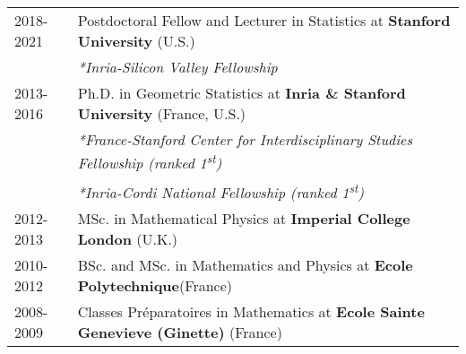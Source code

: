 \begin{tabularx}{\linewidth}{@{}l X@{}}	
2018-2021  & Postdoctoral Fellow and Lecturer in Statistics at \textbf{Stanford University} \hfill (U.S.)\\
& \textit{*Inria-Silicon Valley Fellowship}\\

2013-2016  & Ph.D. in Geometric Statistics at \textbf{Inria \& Stanford University} \hfill (France, U.S.)\\
& \textit{*France-Stanford Center for Interdisciplinary Studies Fellowship (ranked 1\textsuperscript{st})}\\
& \textit{*Inria-Cordi National Fellowship (ranked 1\textsuperscript{st})}\\

2012-2013  & MSc. in Mathematical Physics at \textbf{Imperial College London} \hfill  (U.K.)\\ 

2010-2012 & BSc. and MSc. in Mathematics and Physics at \textbf{Ecole Polytechnique}\hfill (France) \\

2008-2009 & Classes Préparatoires in Mathematics at \textbf{Ecole Sainte Genevieve (Ginette)} \hfill (France)\\
\end{tabularx}
